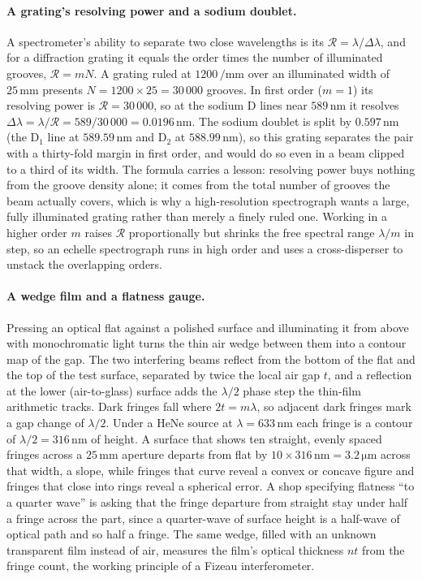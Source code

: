 \paragraph{A grating's resolving power and a sodium doublet.} A spectrometer's
ability to separate two close wavelengths is its 
$\mathcal{R} = \lambda/\Delta\lambda$, and for a diffraction grating it equals
the order times the number of illuminated grooves, $\mathcal{R} = m N$. A
grating ruled at $1200\,\si{\per\milli\meter}$ over an illuminated width of
$25\,\si{\milli\meter}$ presents $N = 1200\times 25 = 30\,000$ grooves. In
first order ($m = 1$) its resolving power is $\mathcal{R} = 30\,000$, so at the
sodium D lines near $589\,\si{\nano\meter}$ it resolves
$\Delta\lambda = \lambda/\mathcal{R} = 589/30\,000 = 0.0196\,\si{\nano\meter}$.
The sodium doublet is split by $0.597\,\si{\nano\meter}$ (the D$_{1}$
line at $589.59\,\si{\nano\meter}$ and D$_{2}$ at $588.99\,\si{\nano\meter}$), so
this grating separates the pair with a thirty-fold margin in first order, and
would do so even in a beam clipped to a third of its width. The formula carries
a lesson: resolving power buys nothing from the groove density alone; it comes
from the total number of grooves the beam actually covers, which is why a
high-resolution spectrograph wants a large, fully illuminated grating rather
than merely a finely ruled one. Working in a higher order $m$ raises
$\mathcal{R}$ proportionally but shrinks the free spectral range $\lambda/m$ in
step, so an echelle spectrograph runs in high order and uses a cross-disperser
to unstack the overlapping orders.

\paragraph{A wedge film and a flatness gauge.} Pressing an optical flat against
a polished surface and illuminating it from above with monochromatic light
turns the thin air wedge between them into a contour map of the gap. The two
interfering beams reflect from the bottom of the flat and the top of the test
surface, separated by twice the local air gap $t$, and a reflection at the
lower (air-to-glass) surface adds the $\lambda/2$ phase step the thin-film
arithmetic tracks. Dark fringes fall where $2t = m\lambda$, so adjacent dark
fringes mark a gap change of $\lambda/2$. Under a HeNe source at
$\lambda = 633\,\si{\nano\meter}$ each fringe is a contour of
$\lambda/2 = 316\,\si{\nano\meter}$ of height. A surface that shows ten
straight, evenly spaced fringes across a $25\,\si{\milli\meter}$ aperture
departs from flat by $10\times 316\,\si{\nano\meter} = 3.2\,\si{\micro\meter}$
across that width, a slope, while fringes that curve reveal a convex or
concave figure and fringes that close into rings reveal a spherical error. A
shop specifying flatness ``to a quarter wave'' is asking that the fringe
departure from straight stay under half a fringe across the part, since a
quarter-wave of surface height is a half-wave of optical path and so half a
fringe. The same wedge, filled with an unknown transparent film instead of air,
measures the film's optical thickness $n t$ from the fringe count, the working
principle of a Fizeau interferometer.


